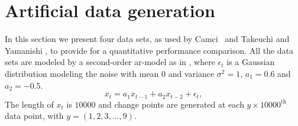 \section{Artificial data generation}\label{sec:artificial_data_generation}
In this section we present four data sets, as used by Camci~\cite{camci2010change} and Takeuchi and Yamanishi \cite{takeuchi2006unifying}, to provide for a quantitative performance comparison.
All the data sets are modeled by a second-order \gls{ar}-model as in , where $\epsilon_t$ is a Gaussian distribution modeling the noise with mean $0$ and variance $\sigma^2 = 1$, $a_1 = 0.6$ and $a_2 = -0.5$.
\begin{equation}\label{eq:artificial_data_sets_model}
  x_t = a_1 x_{t-1} + a_2 x_{t-2} + \epsilon_t,
\end{equation}
The length of $x_t$ is $10000$ and change points are generated at each $y \times 10000^\text{th}$ data point, with $y = (1, 2, 3, \dots, 9)$.

